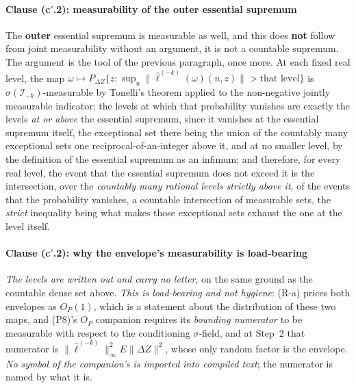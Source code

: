\paragraph{Clause \textup{(c$'$.2)}: measurability of the outer essential supremum}

The \textbf{outer} essential supremum is measurable as well, and this does \textbf{not} follow from
joint measurability without an argument, it is not a countable supremum. The argument is the
tool of the previous
paragraph, once more. At each fixed real level, the map
$\omega\mapsto P_{\Delta Z}\big\{z:\sup_u\|\hat\ell^{(-k)}(\omega)(u,z)\|>\text{that level}\big\}$ is
$\sigma(\mathcal I_{-k})$-measurable by Tonelli's theorem applied to the non-negative jointly measurable
indicator; the levels at which that probability vanishes are exactly the levels \emph{at or above} the
essential supremum, since it vanishes at the essential supremum itself, the exceptional set there being
the union of the countably many exceptional sets one reciprocal-of-an-integer above it, and at no
smaller level, by the definition of the essential supremum as an infimum; and therefore, for every real
level, the event that the essential supremum does not exceed it is the intersection, over the
\emph{countably many rational levels strictly above it}, of the events that the probability vanishes, 
a countable intersection of measurable sets, the \emph{strict} inequality being what makes those
exceptional sets exhaust the one at the level itself.

\paragraph{Clause \textup{(c$'$.2)}: why the envelope's measurability is load-bearing}

\emph{The levels are written out and carry no letter}, on the same ground as the countable
dense set above. \emph{This is load-bearing and not hygiene}: (R-a) prices both envelopes as
$O_P(1)$, which is a statement about the distribution of these two maps, and \textup{(P8)}'s $O_P$
companion requires its \emph{bounding numerator} to be measurable with respect to the conditioning
$\sigma$-field, and at  Step~2 that numerator is
$\|\hat\ell^{(-k)}\|^{2}_\infty E\|\Delta Z\|^{2}$, whose only random factor is the envelope. \emph{No
symbol of the companion's is imported into compiled text}; the numerator is named by what it is.

